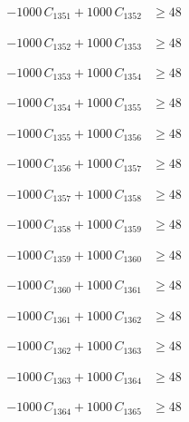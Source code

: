 \documentclass[a4paper,11pt]{article}
\begin{document}
\begin{align}
-1000\,C_{1351} + 1000\,C_{1352} &\geq 48 \nonumber
\end{align}

\begin{align}
-1000\,C_{1352} + 1000\,C_{1353} &\geq 48 \nonumber
\end{align}

\begin{align}
-1000\,C_{1353} + 1000\,C_{1354} &\geq 48 \nonumber
\end{align}

\begin{align}
-1000\,C_{1354} + 1000\,C_{1355} &\geq 48 \nonumber
\end{align}

\begin{align}
-1000\,C_{1355} + 1000\,C_{1356} &\geq 48 \nonumber
\end{align}

\begin{align}
-1000\,C_{1356} + 1000\,C_{1357} &\geq 48 \nonumber
\end{align}

\begin{align}
-1000\,C_{1357} + 1000\,C_{1358} &\geq 48 \nonumber
\end{align}

\begin{align}
-1000\,C_{1358} + 1000\,C_{1359} &\geq 48 \nonumber
\end{align}

\begin{align}
-1000\,C_{1359} + 1000\,C_{1360} &\geq 48 \nonumber
\end{align}

\begin{align}
-1000\,C_{1360} + 1000\,C_{1361} &\geq 48 \nonumber
\end{align}

\begin{align}
-1000\,C_{1361} + 1000\,C_{1362} &\geq 48 \nonumber
\end{align}

\begin{align}
-1000\,C_{1362} + 1000\,C_{1363} &\geq 48 \nonumber
\end{align}

\begin{align}
-1000\,C_{1363} + 1000\,C_{1364} &\geq 48 \nonumber
\end{align}

\begin{align}
-1000\,C_{1364} + 1000\,C_{1365} &\geq 48 \nonumber
\end{align}
\end{document}
